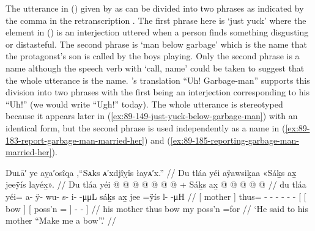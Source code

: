 The utterance in (\lastx) given by \citeauthor{swanton:1909} as  can be divided into two phrases as indicated by the comma in the retranscription .
The first phrase here is  ‘just yuck’ where the  element in (\lastx) is an interjection uttered when a person finds something disgusting or distasteful.
The second phrase is  ‘man below garbage’ which is the name that the protagonst’s son is called by the boys playing.
Only the second phrase is a name although the speech verb with  ‘call, name’ could be taken to suggest that the whole utterance is the name.
\citeauthor{swanton:1909}’s translation “Uh!
Garbage-man” supports this division into two phrases with the first being an interjection corresponding to his “Uh!” (we would write “Ugh!” today).
The whole utterance is stereotyped because it appears later in (\ref{ex:89-149-just-yuck-below-garbage-man}) with an identical form, but the second phrase is used independently as a name in (\ref{ex:89-183-report-garbage-man-married-her}) and (\ref{ex:89-185-reporting-garbage-man-married-her}).

\ex\label{ex:89-118-tell-mother-make-me-bow}%
%
\begingl
	\glpreamble	Duʟā′ ye aỵa′osîqa ,“Sᴀks ᴀ′xdjîỵîs łayᴀ′x.” //
	\glpreamble	Du tláa yéi aÿawsiḵaa «\!Sáḵs ax̱ jeeÿís layéx̱\!». //
	\gla	{} Du tláa {}
		yéi @  @ {} @ {} @ {} @ {} @ {} @ {} +
		{} {} Sáḵs {} {} ax̱  @ {} {}
			 @ {} @ {} @ {} @ {} {}//
	\glb	{} du tláa {}
		yéi= a- ÿ- wu- s- i-  -μμL
		{} {} sáḵs {} {} ax̱ jee =ÿís {}
			{} {} l-  -μH {} //
	\glc	{}[  mother {}]
		thus= - - - - -  -
		{}[ {}[ bow {}] {}[  poss’n = {}]
			\· \· -  - {}] //
	\gld	{} his mother {}
		thus\•  {} {} {} {} {} {}
		{} {} bow {} {} my poss’n =for {}
		 {} {} {} {} {} //
	\glft	‘He said to his mother “Make me a bow”.’
		//
\endgl
\xe

